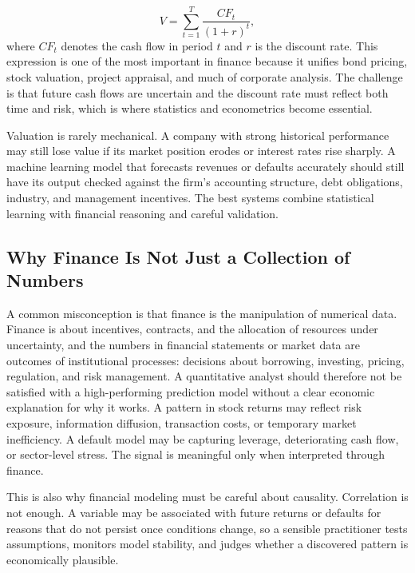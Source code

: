 \documentclass[../ai_in_finance]{subfiles}
\begin{document}
\begin{equation}
V = \sum_{t=1}^{T} \frac{CF_t}{(1+r)^t},\label{eq:intro-present-value}
\end{equation}
where $CF_t$ denotes the cash flow in period $t$ and $r$ is the discount rate. This expression is one of the most important in finance because it unifies bond pricing, stock valuation, project appraisal, and much of corporate analysis. The challenge is that future cash flows are uncertain and the discount rate must reflect both time and risk, which is where statistics and econometrics become essential.

Valuation is rarely mechanical. A company with strong historical performance may still lose value if its market position erodes or interest rates rise sharply. A machine learning model that forecasts revenues or defaults accurately should still have its output checked against the firm's accounting structure, debt obligations, industry, and management incentives. The best systems combine statistical learning with financial reasoning and careful validation.

\subsection{Why Finance Is Not Just a Collection of Numbers}
\label{sec:intro-not-just-numbers}

A common misconception is that finance is the manipulation of numerical data. Finance is about incentives, contracts, and the allocation of resources under uncertainty, and the numbers in financial statements or market data are outcomes of institutional processes: decisions about borrowing, investing, pricing, regulation, and risk management. A quantitative analyst should therefore not be satisfied with a high-performing prediction model without a clear economic explanation for why it works. A pattern in stock returns may reflect risk exposure, information diffusion, transaction costs, or temporary market inefficiency. A default model may be capturing leverage, deteriorating cash flow, or sector-level stress. The signal is meaningful only when interpreted through finance.

This is also why financial modeling must be careful about causality. Correlation is not enough. A variable may be associated with future returns or defaults for reasons that do not persist once conditions change, so a sensible practitioner tests assumptions, monitors model stability, and judges whether a discovered pattern is economically plausible.
\end{document}
